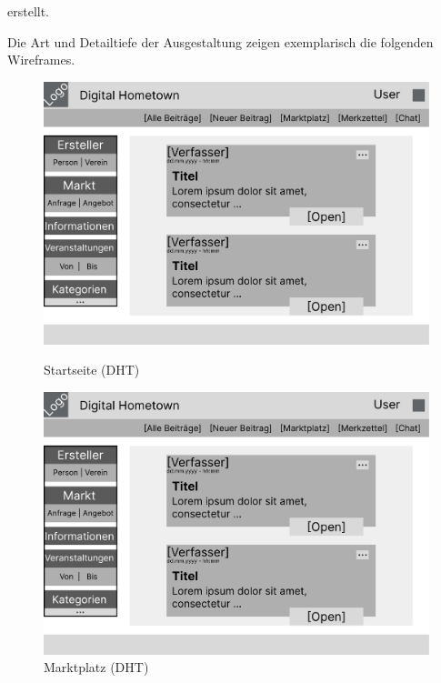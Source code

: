 erstellt.

Die Art und Detailtiefe der Ausgestaltung zeigen exemplarisch die folgenden Wireframes.

\begin{figure}
    \begin{minipage}[t]{0.5\textwidth}
        \includegraphics[page=2, width=1\textwidth]{figures/jan/wire_example.pdf}
        \caption[Startseite (DHT)]{Startseite (DHT)}
        \label{fig:image}
    \end{minipage}
    \begin{minipage}[t]{0.5\textwidth}
        \includegraphics[page=1, width=1\textwidth]{figures/jan/wire_example.pdf}
        \caption[Marktplatz (DHT)]{Marktplatz (DHT)}
        \label{fig:image}
    \end{minipage}
\end{figure}
